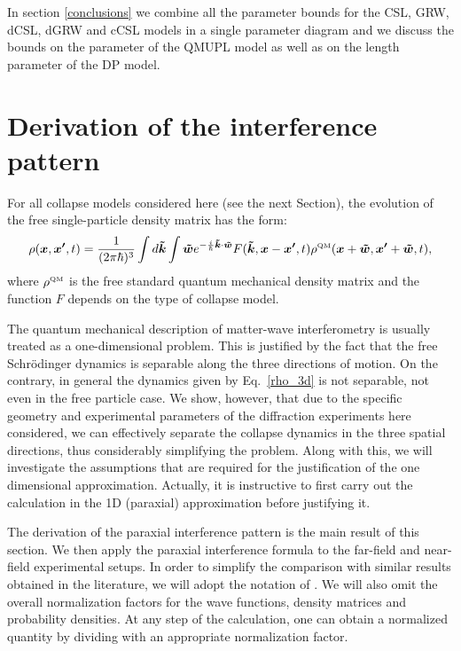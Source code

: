 \documentclass[12pt,groupedaddress,pra,aps]{revtex4-1}
\begin{document}
In section \ref{conclusions} we combine all the parameter bounds for the CSL, GRW, dCSL, dGRW and cCSL models in a single parameter diagram and we discuss the bounds on the parameter of the QMUPL model as well as on the length parameter of the DP model.

\clearpage
\section{Derivation of the interference pattern}\label{dcmip_qm}

For all collapse models considered here (see the next Section), the evolution of the free single-particle density matrix has the form:
\begin{equation}\label{rho_3d}
\rho(\bm{x},\bm{x'},t)=\frac{1}{(2\pi\hbar)^3} \int d\bm{\tilde{k}}  \int \bm{\tilde{w}} e^{-\frac{i}{\hbar}\bm{\tilde{k}} \cdot \bm{\tilde{w}}}\\
 F(\bm{\tilde{k}},\bm{x}-\bm{x'},t) \rho^{\text{\tiny QM}}(\bm{x}+\bm{\tilde{w}},\bm{x'}+\bm{\tilde{w}},t),
\end{equation}
where $\rho^{\text{\tiny QM}}$ is the free standard quantum mechanical density matrix and the function $F$ depends on the type of collapse model. 

The quantum mechanical description of matter-wave interferometry is usually treated as a one-dimensional problem. This is justified by the fact that the free Schr\"odinger dynamics is separable along the three directions of motion. On the contrary, in general the  dynamics given by Eq.~\eqref{rho_3d} is not separable, not even in the free particle case. We show, however, that due to the specific geometry and experimental parameters of the diffraction experiments here considered, we can effectively separate the collapse dynamics in the three spatial directions, thus considerably simplifying the problem. Along with this, we will investigate the assumptions that are required for the justification of the one dimensional approximation. Actually, it is instructive to first carry out the calculation in the 1D (paraxial) approximation before justifying it. 

The derivation of the paraxial interference  pattern is the main result of this section. We then apply the paraxial interference formula to the far-field and near-field experimental setups. In order to simplify the comparison with similar results obtained in the literature, we will adopt the notation of \cite{1464-4266-5-2-362}. We will also omit the overall normalization factors for the wave functions, density matrices and probability densities. At any step of the calculation, one can obtain a normalized quantity by dividing with an appropriate normalization factor. \\ \\
\end{document}

